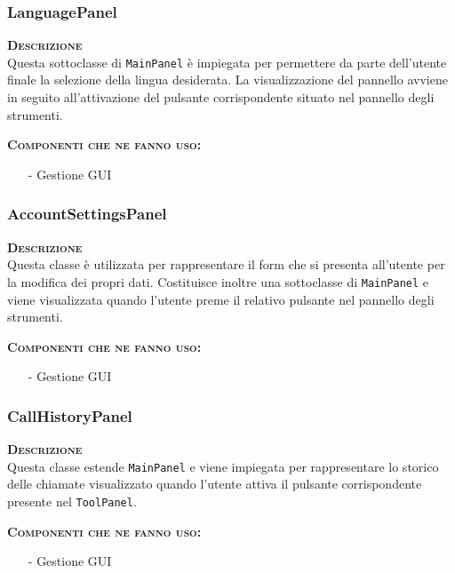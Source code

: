 \subsubsection{LanguagePanel}
\begin{description}
  \item{\scshape\bfseries Descrizione}\\
Questa sottoclasse di \texttt{MainPanel} è impiegata per permettere da parte dell'utente finale la selezione della lingua desiderata. La visualizzazione del pannello avviene in seguito all'attivazione del pulsante corrispondente situato nel pannello degli strumenti.
  \item{\scshape\bfseries Componenti che ne fanno uso:}
  \begin{itemize}[noitemsep,nolistsep]
    \item[-] Gestione GUI
  \end{itemize}
\end{description}

\subsubsection{AccountSettingsPanel}
\begin{description}
  \item{\scshape\bfseries Descrizione}\\
Questa classe è utilizzata per rappresentare il form che si presenta all'utente per la modifica dei propri dati. Costituisce inoltre una sottoclasse di \texttt{MainPanel} e viene visualizzata quando l'utente preme il relativo pulsante nel pannello degli strumenti.
  \item{\scshape\bfseries Componenti che ne fanno uso:}
  \begin{itemize}[noitemsep,nolistsep]
    \item[-] Gestione GUI
  \end{itemize}
\end{description}

\subsubsection{CallHistoryPanel}
\begin{description}
  \item{\scshape\bfseries Descrizione}\\
Questa classe estende \texttt{MainPanel} e viene impiegata per rappresentare lo storico delle chiamate visualizzato quando l'utente attiva il pulsante corrispondente presente nel \texttt{ToolPanel}.
  \item{\scshape\bfseries Componenti che ne fanno uso:}
  \begin{itemize}[noitemsep,nolistsep]
    \item[-] Gestione GUI
  \end{itemize}
\end{description}
\clearpage

